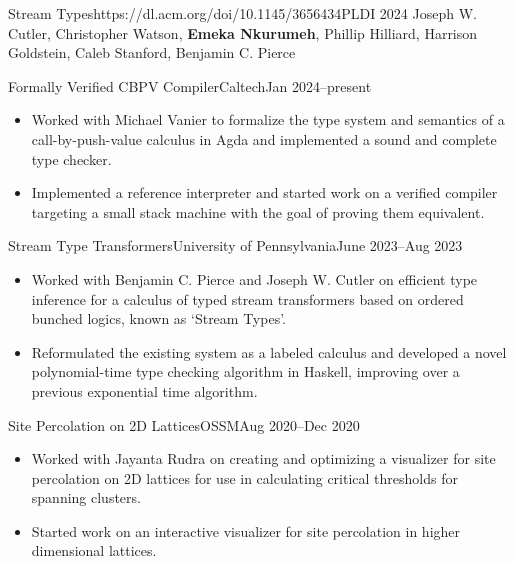 \documentclass[a4paper,10pt]{article}
\begin{document}
    \begin{publication}{Stream Types}{https://dl.acm.org/doi/10.1145/3656434}{PLDI 2024}
      Joseph W. Cutler, Christopher Watson, \textbf{Emeka Nkurumeh}, Phillip Hilliard, Harrison Goldstein, Caleb Stanford, Benjamin C. Pierce
    \end{publication}

    \begin{activity*}{Formally Verified CBPV Compiler}{Caltech}{Jan 2024--present}
      \begin{itemize}[topsep=4pt, partopsep=0pt, itemsep=-2pt]
        \item Worked with Michael Vanier to formalize the type system and semantics of a call-by-push-value calculus in Agda and implemented a sound and complete type checker.
        \item Implemented a reference interpreter and started work on a verified compiler targeting a small stack machine with the goal of proving them equivalent.
      \end{itemize}
    \end{activity*}

    \begin{activity*}{Stream Type Transformers}{University of Pennsylvania}{June 2023--Aug 2023}
      \begin{itemize}[topsep=4pt, partopsep=0pt, itemsep=-2pt]
        \item Worked with Benjamin C. Pierce and Joseph W. Cutler on efficient type inference for a calculus of typed stream transformers based on ordered bunched logics, known as `Stream Types'.
        \item Reformulated the existing system as a labeled calculus and developed a novel polynomial-time type checking algorithm in Haskell, improving over a previous exponential time algorithm.
      \end{itemize}
    \end{activity*}

    \begin{activity*}{Site Percolation on 2D Lattices}{OSSM}{Aug 2020--Dec 2020}
      \begin{itemize}[topsep=4pt, partopsep=0pt, itemsep=-2pt]
        \item Worked with Jayanta Rudra on creating and optimizing a visualizer for site percolation on 2D lattices for use in calculating critical thresholds for spanning clusters.
        \item Started work on an interactive visualizer for site percolation in higher dimensional lattices.
      \end{itemize}
    \end{activity*}
\end{document}
